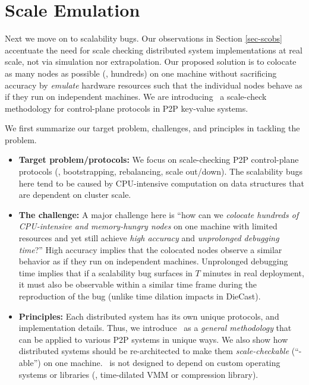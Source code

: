 \section{Scale Emulation}

Next we move on to scalability bugs. Our observations in Section \ref{sec-scobs}
accentuate the need for scale checking distributed system implementations at
real scale, not via simulation nor extrapolation. 
%
Our proposed solution is to colocate as many nodes as possible (\eg, hundreds)
on one machine without sacrificing accuracy by {\em emulate} hardware resources
such that the individual nodes behave as if they run on independent machines.
We are introducing \sck\, a scale-check methodology for control-plane protocols
in P2P key-value systems.

We first summarize our target problem, challenges, and principles in tackling
the problem.

\begin{itemize}

\item {\bf Target problem/protocols:} We focus on scale-checking P2P
control-plane protocols (\eg, bootstrapping, rebalancing, scale out/down). The
scalability bugs here tend to be caused by CPU-intensive computation on data
structures that are dependent on cluster scale.

\item {\bf The challenge:} A major challenge here is
%
``how can we {\em colocate hundreds of CPU-intensive and memory-hungry nodes} on
one machine with limited resources and yet still achieve {\em high accuracy} and
{\em unprolonged debugging time}?''
%
High accuracy implies that the colocated nodes observe a similar behavior as if
they run on independent machines.
%
Unprolonged debugging time implies that if a scalability bug surfaces in $T$
minutes in real deployment, it must also be observable within a similar time
frame during the reproduction of the bug (unlike time dilation impacts in
DieCast).

\item {\bf Principles:}
%
Each distributed system has its own unique protocols, and implementation
details. Thus, we introduce \sck\ as a {\em general methodology} that can be
applied to various P2P systems in unique ways.
%
We also show how distributed systems should be re-architected to make them {\em
scale-checkable} (``\sck-able'') on one machine.
%
\sck\ is not designed to depend on custom operating systems or libraries (\eg,
time-dilated VMM or compression library).

\end{itemize}


